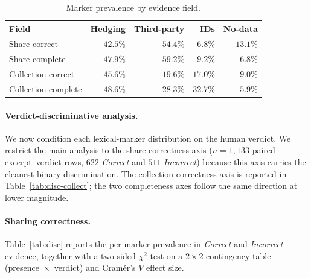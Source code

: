 \documentclass[11pt,a4paper]{article}
\begin{document}
\begin{table}[t]
\centering\small
\caption{Marker prevalence by evidence field.}
\label{tab:perfield}
\begin{tabular}{lrrrr}
\toprule
Field & Hedging & Third-party & IDs & No-data \\
\midrule
Share-correct        & $42.5\%$ & $54.4\%$ & $\phantom{1}6.8\%$ & $13.1\%$ \\
Share-complete       & $47.9\%$ & $59.2\%$ & $\phantom{1}9.2\%$ & $\phantom{1}6.8\%$ \\
Collection-correct   & $45.6\%$ & $19.6\%$ & $17.0\%$ & $\phantom{1}9.0\%$ \\
Collection-complete  & $48.6\%$ & $28.3\%$ & $32.7\%$ & $\phantom{1}5.9\%$ \\
\bottomrule
\end{tabular}
\end{table}

\paragraph{Verdict-discriminative analysis.}\label{sec:verdict}
We now condition each lexical-marker distribution on the human verdict.
We restrict the main analysis to the share-correctness axis
($n=1{,}133$ paired excerpt--verdict rows, $622$ \emph{Correct} and
$511$ \emph{Incorrect}) because this axis carries the cleanest binary
discrimination. The collection-correctness axis is reported in
Table~\ref{tab:disc-collect}; the two completeness axes follow the
same direction at lower magnitude.

\paragraph{Sharing correctness.}
Table~\ref{tab:disc} reports the per-marker prevalence in
\emph{Correct} and \emph{Incorrect} evidence, together with a
two-sided $\chi^{2}$ test on a $2{\times}2$ contingency table
(presence~$\times$~verdict) and Cram\'{e}r's $V$ effect size.
\end{document}
